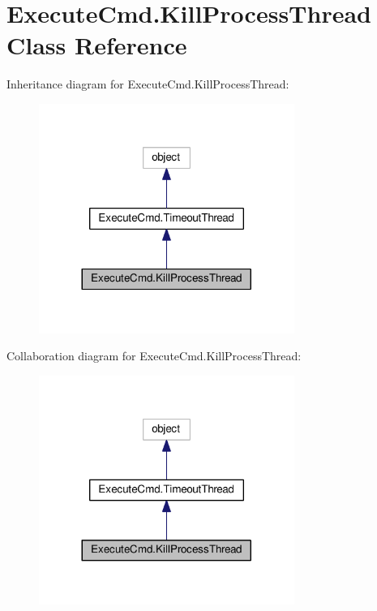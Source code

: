 \hypertarget{class_execute_cmd_1_1_kill_process_thread}{\section{Execute\-Cmd.\-Kill\-Process\-Thread Class Reference}
\label{class_execute_cmd_1_1_kill_process_thread}
}


Inheritance diagram for Execute\-Cmd.\-Kill\-Process\-Thread\-:
\nopagebreak
\begin{figure}[H]
\begin{center}
\leavevmode
\includegraphics[width=236pt]{class_execute_cmd_1_1_kill_process_thread__inherit__graph}
\end{center}
\end{figure}


Collaboration diagram for Execute\-Cmd.\-Kill\-Process\-Thread\-:
\nopagebreak
\begin{figure}[H]
\begin{center}
\leavevmode
\includegraphics[width=236pt]{class_execute_cmd_1_1_kill_process_thread__coll__graph}
\end{center}
\end{figure}
